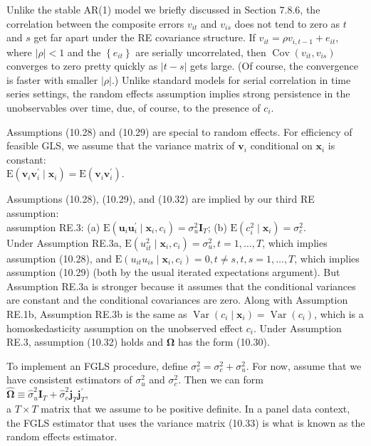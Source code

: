 \documentclass[10pt]{article}
\begin{document}
Unlike the stable AR(1) model we briefly discussed in Section 7.8.6, the correlation between the composite errors $v_{i t}$ and $v_{i s}$ does not tend to zero as $t$ and $s$ get far apart under the RE covariance structure. If $v_{i t}=\rho v_{i, t-1}+e_{i t}$, where $|\rho|<1$ and the $\left\{e_{i t}\right\}$ are serially uncorrelated, then $\operatorname{Cov}\left(v_{i t}, v_{i s}\right)$ converges to zero pretty quickly as $|t-s|$ gets large. (Of course, the convergence is faster with smaller $|\rho|$.) Unlike standard models for serial correlation in time series settings, the random effects assumption implies strong persistence in the unobservables over time, due, of course, to the presence of $c_{i}$.

Assumptions (10.28) and (10.29) are special to random effects. For efficiency of feasible GLS, we assume that the variance matrix of $\mathbf{v}_{i}$ conditional on $\mathbf{x}_{i}$ is constant:\\
$\mathrm{E}\left(\mathbf{v}_{i} \mathbf{v}_{i}^{\prime} \mid \mathbf{x}_{i}\right)=\mathrm{E}\left(\mathbf{v}_{i} \mathbf{v}_{i}^{\prime}\right)$.

Assumptions (10.28), (10.29), and (10.32) are implied by our third RE assumption:\\
assumption RE.3: (a) $\mathrm{E}\left(\mathbf{u}_{i} \mathbf{u}_{i}^{\prime} \mid \mathbf{x}_{i}, c_{i}\right)=\sigma_{u}^{2} \mathbf{I}_{T}$; (b) $\mathrm{E}\left(c_{i}^{2} \mid \mathbf{x}_{i}\right)=\sigma_{c}^{2}$.\\
Under Assumption RE.3a, $\mathrm{E}\left(u_{i t}^{2} \mid \mathbf{x}_{i}, c_{i}\right)=\sigma_{u}^{2}, t=1, \ldots, T$, which implies assumption (10.28), and $\mathrm{E}\left(u_{i t} u_{i s} \mid \mathbf{x}_{i}, c_{i}\right)=0, t \neq s, t, s=1, \ldots, T$, which implies assumption (10.29) (both by the usual iterated expectations argument). But Assumption RE.3a is stronger because it assumes that the conditional variances are constant and the conditional covariances are zero. Along with Assumption RE.1b, Assumption RE.3b is the same as $\operatorname{Var}\left(c_{i} \mid \mathbf{x}_{i}\right)=\operatorname{Var}\left(c_{i}\right)$, which is a homoskedasticity assumption on the unobserved effect $c_{i}$. Under Assumption RE.3, assumption (10.32) holds and $\boldsymbol{\Omega}$ has the form (10.30).

To implement an FGLS procedure, define $\sigma_{v}^{2}=\sigma_{c}^{2}+\sigma_{u}^{2}$. For now, assume that we have consistent estimators of $\sigma_{u}^{2}$ and $\sigma_{c}^{2}$. Then we can form\\
$\hat{\boldsymbol{\Omega}} \equiv \hat{\sigma}_{u}^{2} \mathbf{I}_{T}+\hat{\sigma}_{c}^{2} \mathbf{j}_{T} \mathbf{j}_{T}^{\prime}$,\\
a $T \times T$ matrix that we assume to be positive definite. In a panel data context, the FGLS estimator that uses the variance matrix (10.33) is what is known as the random effects estimator.
\end{document}

